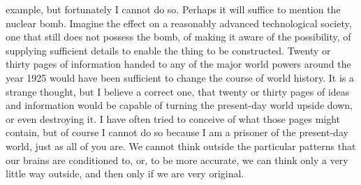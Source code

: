 \documentclass[kindlepaper]{BHCexam4kindle}
\begin{document}
example, but fortunately I cannot do so. Perhaps it will suffice to mention the nuclear bomb. Imagine the
effect on a reasonably advanced technological society, one that still does not possess the bomb, of making it
aware of the possibility, of supplying sufficient details to enable the thing to be constructed. Twenty or thirty
pages of information handed to any of the major world powers around the year 1925 would have been
sufficient to change the course of world history. It is a strange thought, but I believe a correct one, that twenty
or thirty pages of ideas and information would be capable of turning the present-day world upside down, or
even destroying it. I have often tried to conceive of what those pages might contain, but of course I cannot do
so because I am a prisoner of the present-day world, just as all of you are. We cannot think outside the
particular patterns that our brains are conditioned to, or, to be more accurate, we can think only a very little
way outside, and then only if we are very original.
\clearpage
\end{document}
